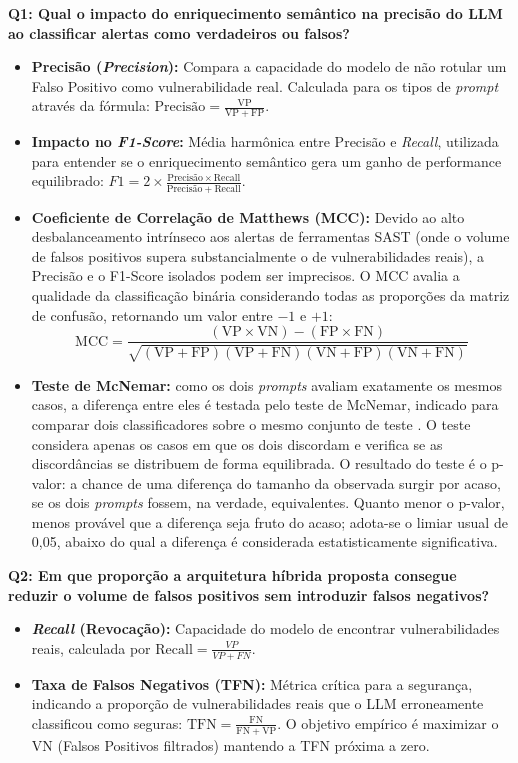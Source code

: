 \textbf{Q1: Qual o impacto do enriquecimento semântico na precisão do LLM ao classificar alertas como verdadeiros ou falsos?}
\begin{itemize}
\item \textbf{Precisão (\textit{Precision}):} Compara a capacidade do modelo de não rotular um Falso Positivo como vulnerabilidade real. Calculada para os tipos de \textit{prompt} através da fórmula: $\mbox{Precisão} = \frac{\mathrm{VP}}{\mathrm{VP} + \mathrm{FP}}$.
\item \textbf{Impacto no \textit{F1-Score}:} Média harmônica entre Precisão e \textit{Recall}, utilizada para entender se o enriquecimento semântico gera um ganho de performance equilibrado: $F1 = 2 \times \frac{\mbox{Precisão} \times \mathrm{Recall}}{\mbox{Precisão} + \mathrm{Recall}}$.

\item \textbf{Coeficiente de Correlação de Matthews (MCC):} Devido ao alto desbalanceamento intrínseco aos alertas de ferramentas SAST (onde o volume de falsos positivos supera substancialmente o de vulnerabilidades reais), a Precisão e o F1-Score isolados podem ser imprecisos. O MCC avalia a qualidade da classificação binária considerando todas as proporções da matriz de confusão, retornando um valor entre $-1$ e $+1$:
$$\mathrm{MCC} = \frac{(\mathrm{VP} \times \mathrm{VN}) - (\mathrm{FP} \times \mathrm{FN})}{\sqrt{(\mathrm{VP}+\mathrm{FP})(\mathrm{VP}+\mathrm{FN})(\mathrm{VN}+\mathrm{FP})(\mathrm{VN}+\mathrm{FN})}}$$
\item \textbf{Teste de McNemar:} como os dois \textit{prompts} avaliam exatamente os mesmos casos, a diferença entre eles é testada pelo teste de McNemar, indicado para comparar dois classificadores sobre o mesmo conjunto de teste \cite{dietterich1998tests}. O teste considera apenas os casos em que os dois discordam e verifica se as discordâncias se distribuem de forma equilibrada. O resultado do teste é o p-valor: a chance de uma diferença do tamanho da observada surgir por acaso, se os dois \textit{prompts} fossem, na verdade, equivalentes. Quanto menor o p-valor, menos provável que a diferença seja fruto do acaso; adota-se o limiar usual de 0,05, abaixo do qual a diferença é considerada estatisticamente significativa.
\end{itemize}

\textbf{Q2: Em que proporção a arquitetura híbrida proposta consegue reduzir o volume de falsos positivos sem introduzir falsos negativos?}
\begin{itemize}
\item \textbf{\textit{Recall} (Revocação):} Capacidade do modelo de encontrar vulnerabilidades reais, calculada por $\mathrm{Recall} = \frac{VP}{VP + FN}$.
\item \textbf{Taxa de Falsos Negativos (TFN):} Métrica crítica para a segurança, indicando a proporção de vulnerabilidades reais que o LLM erroneamente classificou como seguras: $\mathrm{TFN} = \frac{\mathrm{FN}}{\mathrm{FN} + \mathrm{VP}}$. O objetivo empírico é maximizar o VN (Falsos Positivos filtrados) mantendo a TFN próxima a zero.
\end{itemize}

